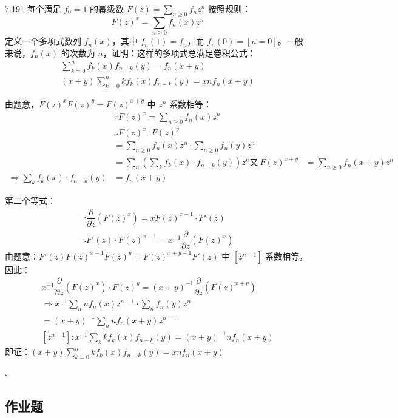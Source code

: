 \begin{problem}{7.19}{1}
  每个满足 \( f_0 = 1 \) 的幂级数 \( F(z) = \sum_{n \geqslant 0} f_n z^n \) 按照规则：
  \[
    F(z)^x = \sum_{n \geqslant 0} f_n(x) z^n
  \]
  定义一个多项式数列 \( f_n(x) \)，其中 \( f_n(1) = f_n \)，而 \( f_n(0) = [n = 0] \)。一般来说，\( f_n(x) \) 的次数为 \( n \)，证明：这样的多项式总满足卷积公式：
  \begin{gather*}
    \sum_{k=0}^n f_k (x) f_{n-k} (y) = f_n (x+y) \\
    (x+y) \sum_{k=0}^n k f_k(x) f_{n-k}(y) = xn f_n (x+y)
  \end{gather*}
\end{problem}

由题意，\( F(z)^x F(z)^y = F(z)^{x+y} \) 中 \( z^n \) 系数相等：
\begin{align*}
  & \because F(z)^x = \sum_{n \geqslant 0} f_n(x) z^n \\
  & \therefore F(z)^x \cdot F(z)^y \\[6pt]
  &= \sum_{n \geqslant 0} f_n(x) z^n \cdot \sum_{n \geqslant 0} f_n(y) z^n \\
  &= \sum_n \left( \sum_k f_k(x) \cdot f_{n-k}(y) \right) z^n
  \text{又} \ F(z)^{x+y} &= \sum_{n \geqslant 0} f_n(x+y) z^n \\
  \Rightarrow \sum_k f_k (x) \cdot f_{n-k}(y) &= f_n (x+y)
\end{align*}

第二个等式：
\begin{gather*}
  \because \dfrac{\partial}{\partial z} (F(z)^x) = xF(z)^{x-1} \cdot F'(z) \\
  \therefore F'(z) \cdot F(z)^{x-1} = x^{-1} \dfrac{\partial}{\partial z} (F(z)^x)
\end{gather*}
由题意：\( F'(z) F(z)^{x-1} F(z)^y = F(z)^{x+y-1} F'(z) \) 中 \( [z^{n-1}] \) 系数相等，因此：
\begin{gather*}
  x^{-1} \dfrac{\partial}{\partial z} (F(z)^x) \cdot F(z)^y = (x+y)^{-1} \dfrac{\partial}{\partial z}(F(z)^{x+y}) \\
  \Rightarrow x^{-1} \sum_n n f_n (x) z^{n-1} \cdot \sum_n f_n (y) z^n \\
  = (x+y)^{-1} \sum_n n f_n (x+y) z^{n-1} \\
  [z^{n-1}] : x^{-1} \sum_k k f_k (x) f_{n-k} (y) = (x+y)^{-1} n f_n (x+y)
\end{gather*}
即证：\( (x+y) \sum_{k=0}^n k f_k(x) f_{n-k}(y) = xn f_n (x+y) \)

\hfill \( \square \)

\subsection{作业题}

